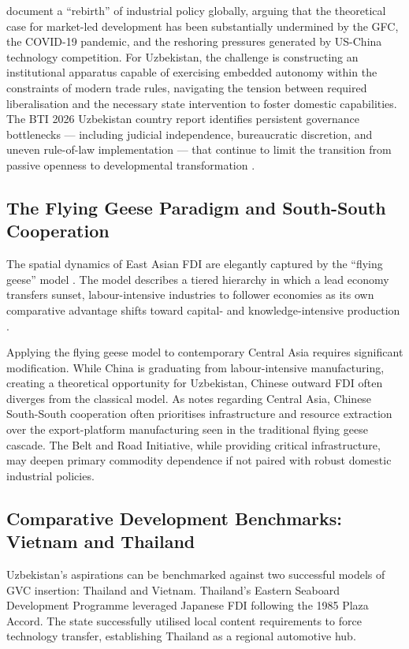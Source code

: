 \citet{andreoni2023rp} document a ``rebirth'' of industrial policy globally, arguing that the theoretical case for market-led development has been substantially undermined by the GFC, the COVID-19 pandemic, and the reshoring pressures generated by US-China technology competition. For Uzbekistan, the challenge is constructing an institutional apparatus capable of exercising embedded autonomy within the constraints of modern trade rules, navigating the tension between required liberalisation and the necessary state intervention to foster domestic capabilities. The BTI 2026 Uzbekistan country report identifies persistent governance bottlenecks --- including judicial independence, bureaucratic discretion, and uneven rule-of-law implementation --- that continue to limit the transition from passive openness to developmental transformation \citep{bti2026uzbekistan}.

\subsection{The Flying Geese Paradigm and South-South Cooperation}

The spatial dynamics of East Asian FDI are elegantly captured by the ``flying geese'' model \citep{akamatsu1962}. The model describes a tiered hierarchy in which a lead economy transfers sunset, labour-intensive industries to follower economies as its own comparative advantage shifts toward capital- and knowledge-intensive production \citep{dunning1981}.

Applying the flying geese model to contemporary Central Asia requires significant modification. While China is graduating from labour-intensive manufacturing, creating a theoretical opportunity for Uzbekistan, Chinese outward FDI often diverges from the classical model. As \citet{pomfret2019} notes regarding Central Asia, Chinese South-South cooperation often prioritises infrastructure and resource extraction over the export-platform manufacturing seen in the traditional flying geese cascade. The Belt and Road Initiative, while providing critical infrastructure, may deepen primary commodity dependence if not paired with robust domestic industrial policies.

\subsection{Comparative Development Benchmarks: Vietnam and Thailand}

Uzbekistan's aspirations can be benchmarked against two successful models of GVC insertion: Thailand and Vietnam. Thailand's Eastern Seaboard Development Programme leveraged Japanese FDI following the 1985 Plaza Accord. The state successfully utilised local content requirements to force technology transfer, establishing Thailand as a regional automotive hub.

